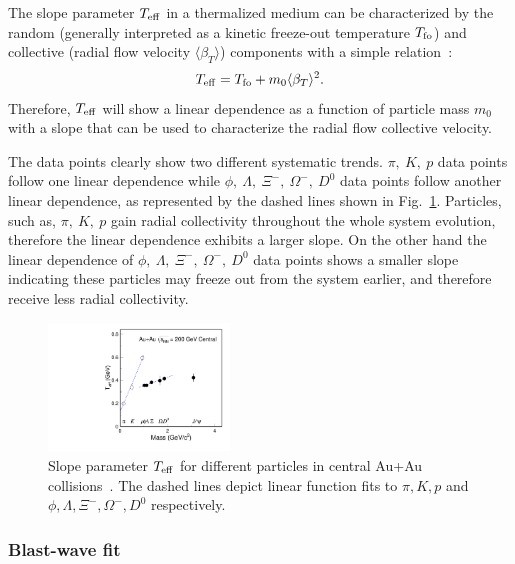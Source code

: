 \documentclass[%
 reprint,	
showpacs,
 amsmath,amssymb,
 aps,
 prc,
]{revtex4-1}
\begin{document}
The slope parameter $T_{\rm eff}$ in a thermalized medium can be characterized by the random (generally interpreted as a kinetic freeze-out temperature $T_{\rm fo}$) and collective (radial flow velocity $\langle\beta_{T}\rangle$) components with a simple relation~\cite{StarWhitePaper,Csorgo:1995bi,Kolb:2003dz}:
\begin{equation}
  \begin{aligned}
T_{\rm eff} = T_{\rm fo} + m_0 \langle\beta_{T}\rangle^2.
  \end{aligned}
\label{equ:equation7}
\end{equation}
Therefore, $T_{\rm eff}$ will show a linear dependence as a function of particle mass $m_0$ with a slope that can be used to characterize the radial flow collective velocity.

The data points clearly show two different systematic trends. $\pi,\ K,\ p$ data points follow one linear dependence while $\phi,\ \Lambda,\ \Xi^{-},\ \Omega^{-},\ D^0$ data points follow another linear dependence, as represented by the dashed lines shown in Fig.~\ref{fig:Teff_ALL}. Particles, such as, $\pi,\ K,\ p$ gain radial collectivity throughout the whole system evolution, therefore the linear dependence exhibits a larger slope. On the other hand the linear dependence of $\phi,\ \Lambda,\ \Xi^{-},\ \Omega^{-},\ D^0$ data points shows a smaller slope indicating these particles may freeze out from the system earlier, and therefore receive less radial collectivity.


\begin{figure}
\centering
\includegraphics[width=0.43\textwidth]{fig/Teff_ALL.pdf}
\caption{Slope parameter $T_{\rm eff}$ for different particles in central Au+Au collisions~\cite{Adams:2003xp,Abelev:2007rw,Adams:2006ke,Adamczyk:2013tvk}. The dashed lines depict linear function fits to $\pi,K,p$ and $\phi,\Lambda,\Xi^{-},\Omega^{-},D^0$ respectively.}
\label{fig:Teff_ALL} 
\end{figure}


\subsubsection{Blast-wave fit}
\label{result:collectivity:BW}
\end{document}
